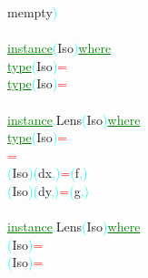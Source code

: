 {\rm{}mempty}\textcolor{cyan}{)}\\\\\textcolor{green}{\underline{instance}}\hsspace \textcolor{cyan}{(}{\rm{}Iso}\textcolor{cyan}{)}\hsspace \textcolor{green}{\underline{where}}\\\hstab \textcolor{green}{\underline{type}}\hsspace \textcolor{cyan}{(}{\rm{}Iso}\textcolor{cyan}{)}\hsspace \textcolor{red}{=}\\\hstab \textcolor{green}{\underline{type}}\hsspace \textcolor{cyan}{(}{\rm{}Iso}\textcolor{cyan}{)}\hsspace \textcolor{red}{=}\\\\\textcolor{green}{\underline{instance}}\textcolor{cyan}{.}{\rm{}Lens}\hsspace \textcolor{cyan}{(}{\rm{}Iso}\textcolor{cyan}{)}\hsspace \textcolor{green}{\underline{where}}\\\hstab \textcolor{green}{\underline{type}}\hsspace \textcolor{cyan}{(}{\rm{}Iso}\textcolor{cyan}{)}\hsspace \textcolor{red}{=}\hsspace {\rm{}()}\\\hsspace \textcolor{red}{=}\hsspace {\rm{}()}\\\hsspace \textcolor{cyan}{(}{\rm{}Iso}\textcolor{cyan}{)}\hsspace \textcolor{cyan}{(}{\rm{}dx}\textcolor{cyan}{,}\textcolor{cyan}{)}\hsspace \textcolor{red}{=}\hsspace \textcolor{cyan}{(}{\rm{}f}\textcolor{cyan}{,}\textcolor{cyan}{)}\\\hsspace \textcolor{cyan}{(}{\rm{}Iso}\textcolor{cyan}{)}\hsspace \textcolor{cyan}{(}{\rm{}dy}\textcolor{cyan}{,}\textcolor{cyan}{)}\hsspace \textcolor{red}{=}\hsspace \textcolor{cyan}{(}{\rm{}g}\textcolor{cyan}{,}\textcolor{cyan}{)}\\\\\textcolor{green}{\underline{instance}}\textcolor{cyan}{.}{\rm{}Lens}\hsspace \textcolor{cyan}{(}{\rm{}Iso}\textcolor{cyan}{)}\hsspace \textcolor{green}{\underline{where}}\\\hsspace \textcolor{cyan}{(}{\rm{}Iso}\textcolor{cyan}{)}\hsspace \textcolor{red}{=}\\\hsspace \textcolor{cyan}{(}{\rm{}Iso}\textcolor{cyan}{)}\hsspace \textcolor{red}{=}\\
